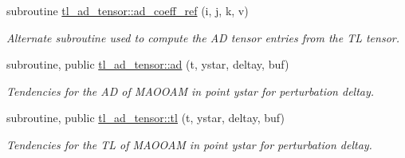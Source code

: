\begin{DoxyCompactItemize}
subroutine \hyperlink{namespacetl__ad__tensor_aef0157a16688323e3c855ef451d6948f}{tl\+\_\+ad\+\_\+tensor\+::ad\+\_\+coeff\+\_\+ref} (i, j, k, v)
\begin{DoxyCompactList}\small\item\em Alternate subroutine used to compute the AD tensor entries from the TL tensor. \end{DoxyCompactList}\item 
subroutine, public \hyperlink{namespacetl__ad__tensor_af4683da4f4149b809eb66c3223266ffd}{tl\+\_\+ad\+\_\+tensor\+::ad} (t, ystar, deltay, buf)
\begin{DoxyCompactList}\small\item\em Tendencies for the AD of M\+A\+O\+O\+AM in point ystar for perturbation deltay. \end{DoxyCompactList}\item 
subroutine, public \hyperlink{namespacetl__ad__tensor_a2a6bcaa9d4e82c35f6bfb2fdb9016dd9}{tl\+\_\+ad\+\_\+tensor\+::tl} (t, ystar, deltay, buf)
\begin{DoxyCompactList}\small\item\em Tendencies for the TL of M\+A\+O\+O\+AM in point ystar for perturbation deltay. \end{DoxyCompactList}\end{DoxyCompactItemize}
